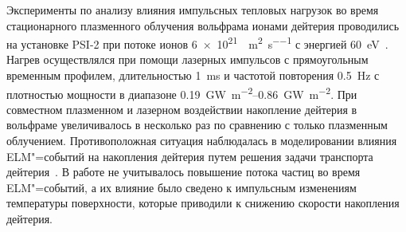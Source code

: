 Эксперименты по анализу влияния импульсных тепловых нагрузок во время стационарного плазменного облучения вольфрама ионами дейтерия проводились на установке PSI-2 при потоке ионов \SI{6e21}{\Deuterium\per\meter\squared\per\second} с энергией \SI{60}{\electronvolt}~\cite{Huber2016_1, Huber2016_2}. Нагрев осуществлялся при помощи лазерных импульсов с прямоугольным временным профилем, длительностью \SI{1}{\milli\second} и частотой повторения \SI{0.5}{\hertz} с плотностью мощности в диапазоне \SIrange{0.19}{0.86}{\giga\watt\per\meter\squared}. При совместном плазменном и лазерном воздействии накопление дейтерия в вольфраме увеличивалось в несколько раз по сравнению с только плазменным облучением.  Противоположная ситуация наблюдалась в моделировании влияния ELM"=событий на накопления дейтерия путем решения задачи транспорта дейтерия~\cite{Hu2015}. В работе не учитывалось повышение потока частиц во время ELM"=событий, а их влияние было сведено к импульсным изменениям температуры поверхности, которые приводили к снижению скорости накопления дейтерия.


